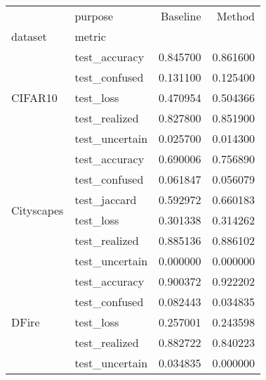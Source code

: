 \begin{tabular}{llrr}
\toprule
 & purpose & Baseline & Method \\
dataset & metric &  &  \\
\midrule
\multirow[t]{5}{*}{CIFAR10} & test_accuracy & 0.845700 & 0.861600 \\
 & test_confused & 0.131100 & 0.125400 \\
 & test_loss & 0.470954 & 0.504366 \\
 & test_realized & 0.827800 & 0.851900 \\
 & test_uncertain & 0.025700 & 0.014300 \\
\cline{1-4}
\multirow[t]{6}{*}{Cityscapes} & test_accuracy & 0.690006 & 0.756890 \\
 & test_confused & 0.061847 & 0.056079 \\
 & test_jaccard & 0.592972 & 0.660183 \\
 & test_loss & 0.301338 & 0.314262 \\
 & test_realized & 0.885136 & 0.886102 \\
 & test_uncertain & 0.000000 & 0.000000 \\
\cline{1-4}
\multirow[t]{5}{*}{DFire} & test_accuracy & 0.900372 & 0.922202 \\
 & test_confused & 0.082443 & 0.034835 \\
 & test_loss & 0.257001 & 0.243598 \\
 & test_realized & 0.882722 & 0.840223 \\
 & test_uncertain & 0.034835 & 0.000000 \\
\cline{1-4}
\bottomrule
\end{tabular}
